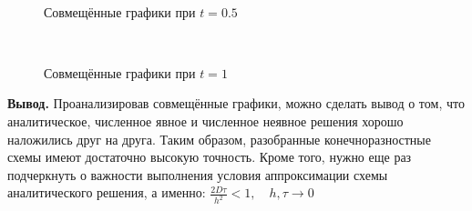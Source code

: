 \documentclass[14pt,a4paper]{scrartcl}
\begin{document}
\begin{figure}[H]
	\begin{minipage}[h]{1\linewidth}
		\\
		\caption{Совмещённые графики при $t=0.5$}
	\end{minipage}
\end{figure}

\begin{figure}[H]
	\begin{minipage}[h]{1\linewidth}
		\\
		\caption{Совмещённые графики при $t=1$}
	\end{minipage}
\end{figure}

\textbf{Вывод.} Проанализировав совмещённые графики, можно сделать вывод о том, что аналитическое, численное явное и численное неявное решения хорошо наложились друг на друга. Таким образом, разобранные конечноразностные схемы имеют достаточно высокую точность. Кроме того, нужно еще раз подчеркнуть о важности выполнения условия аппроксимации схемы аналитического решения, а именно: $\frac{2D\tau}{h^2} < 1, \quad h,\tau \rightarrow 0$
\end{document}
